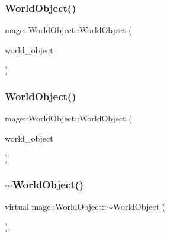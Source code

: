 \subsubsection{\texorpdfstring{World\+Object()}{WorldObject()}\hspace{0.1cm}{\footnotesize\ttfamily [2/3]}}
{\footnotesize\ttfamily mage\+::\+World\+Object\+::\+World\+Object (\begin{DoxyParamCaption}\item[{const \hyperlink{classmage_1_1_world_object}{World\+Object} \&}]{world\+\_\+object }\end{DoxyParamCaption})}

\hypertarget{classmage_1_1_world_object_af8e2a82bd8a59d1ec8776e27ed5900cd}{}\label{classmage_1_1_world_object_af8e2a82bd8a59d1ec8776e27ed5900cd} 
\subsubsection{\texorpdfstring{World\+Object()}{WorldObject()}\hspace{0.1cm}{\footnotesize\ttfamily [3/3]}}
{\footnotesize\ttfamily mage\+::\+World\+Object\+::\+World\+Object (\begin{DoxyParamCaption}\item[{\hyperlink{classmage_1_1_world_object}{World\+Object} \&\&}]{world\+\_\+object }\end{DoxyParamCaption})\hspace{0.3cm}{\ttfamily [default]}}

\hypertarget{classmage_1_1_world_object_a6ae28ad98832c1e97b681816755a79f2}{}\label{classmage_1_1_world_object_a6ae28ad98832c1e97b681816755a79f2} 
\subsubsection{\texorpdfstring{$\sim$\+World\+Object()}{~WorldObject()}}
{\footnotesize\ttfamily virtual mage\+::\+World\+Object\+::$\sim$\+World\+Object (\begin{DoxyParamCaption}{ }\end{DoxyParamCaption})\hspace{0.3cm}{\ttfamily [virtual]}, {\ttfamily [default]}}



